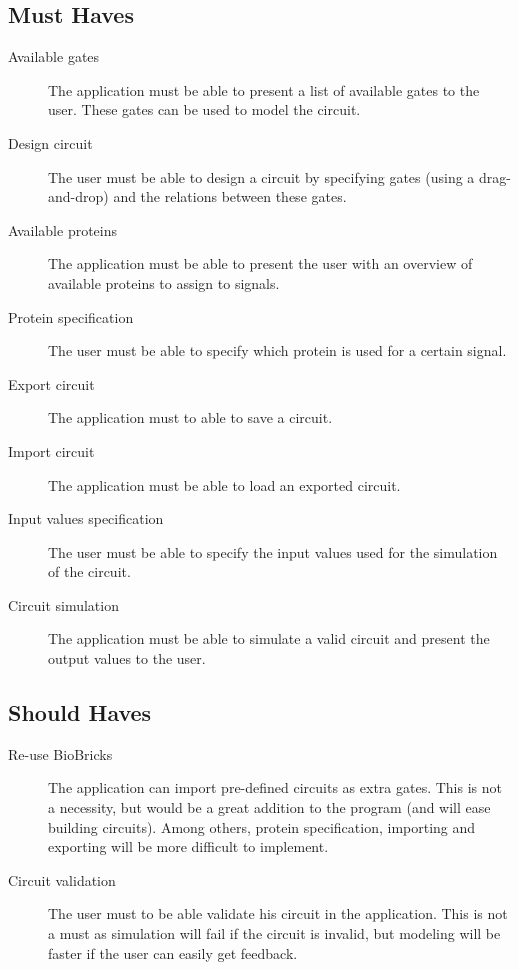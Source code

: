 \documentclass[a4paper]{article}
\begin{document}
\subsection{Must Haves}
\begin{description}
\item[Available gates] The application must be able to present a list of available gates to the user. These gates can be used to model the circuit.
\item[Design circuit] The user must be able to design a circuit by specifying gates (using a drag-and-drop) and the relations between these gates.
\item[Available proteins] The application must be able to present the user with an overview of available proteins to assign to signals.
\item[Protein specification] The user must be able to specify which protein is used for a certain signal.
\item[Export circuit] The application must to able to save a circuit.
\item[Import circuit] The application must be able to load an exported circuit.
\item[Input values specification] The user must be able to specify the input values used for the simulation of the circuit.
\item[Circuit simulation] The application must be able to simulate a valid circuit and present the output values to the user.
\end{description}

\subsection{Should Haves}
\begin{description}
\item[Re-use BioBricks] The application can import pre-defined circuits as extra gates. This is not a necessity, but would be a great addition to the program (and will ease building circuits). Among others, protein specification, importing and exporting will be more difficult to implement.
\item[Circuit validation] The user must to be able validate his circuit in the application. This is not a must as simulation will fail if the circuit is invalid, but modeling will be faster if the user can easily get feedback.
\end{description}
\end{document}
